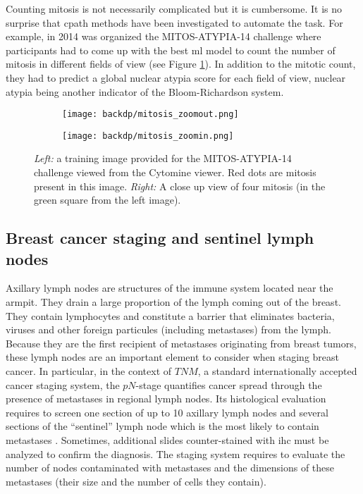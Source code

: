 Counting mitosis is not necessarily complicated but it is cumbersome. It is no surprise that \acrlong{cpath} methods have been investigated to automate the task. For example, in 2014 was organized the MITOS-ATYPIA-14 challenge \cite{roux2014mitos} where participants had to come up with the best \acrlong{ml} model to count the number of mitosis in different fields of view (see Figure \ref{fig:backdp:mitos_atypia}). In addition to the mitotic count, they had to predict a global nuclear atypia score for each field of view, nuclear atypia being another indicator of the Bloom-Richardson system. 

\begin{figure}
  \centering
  \begin{subfigure}[t]{0.48\textwidth}
    \centering
    \texttt{[image: backdp/mitosis\_zoomout.png]}
  \end{subfigure}
  \begin{subfigure}[t]{0.48\textwidth}
    \centering
    \texttt{[image: backdp/mitosis\_zoomin.png]}
  \end{subfigure}
  \caption{\textit{Left:} a training image provided for the MITOS-ATYPIA-14 challenge viewed from the Cytomine viewer. Red dots are mitosis present in this image. \textit{Right:} A close up view of four mitosis (in the green square from the left image).}
  \label{fig:backdp:mitos_atypia}
\end{figure}

\subsection{Breast cancer staging and sentinel lymph nodes}
\label{ssec:backdp:analysis_camelyon}

Axillary lymph nodes are structures of the immune system located near the armpit. They drain a large proportion of the lymph coming out of the breast. They contain lymphocytes and constitute a barrier that eliminates bacteria, viruses and other foreign particules (including metastases) from the lymph. Because they are the first recipient of metastases originating from breast tumors, these lymph nodes are an important element to consider when staging breast cancer. In particular, in the context of $TNM$, a standard internationally accepted cancer staging system, the $pN$-stage \cite{reisenbichler2022tmnstagingbreast} quantifies cancer spread through the presence of metastases in regional lymph nodes. Its histological evaluation requires to screen one section of up to 10 axillary lymph nodes and several sections of the ``sentinel'' lymph node which is the most likely to contain metastases \cite{weaver2010pathology}. Sometimes, additional slides counter-stained with \acrshort{ihc} must be analyzed to confirm the diagnosis. The staging system requires to evaluate the number of nodes contaminated with metastases and the dimensions of these metastases (\ie their size and the number of cells they contain).

